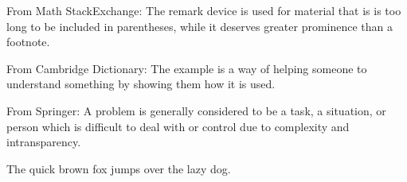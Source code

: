 \begin{remark}\leavevmode\newline
    From Math StackExchange: The remark device is used for material that is is too long to be included in parentheses, while it deserves greater prominence than a footnote.
\end{remark}

\begin{example}
    From Cambridge Dictionary: The example is a way of helping someone to understand something by showing them how it is used.
\end{example}

\begin{problem}
    From Springer: A problem is generally considered to be a task, a situation, or person which is difficult to deal with or control due to complexity and intransparency.
\end{problem}

\begin{solution}
    The quick brown fox jumps over the lazy dog.
\end{solution}
